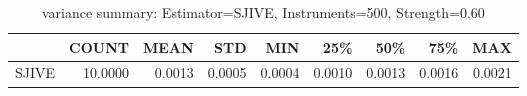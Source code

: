 \begin{table}[ht]
\centering
\caption{variance summary: Estimator=SJIVE, Instruments=500, Strength=0.60}
\begin{tabular}{lrrrrrrrr}
\toprule
 & COUNT & MEAN & STD & MIN & 25\% & 50\% & 75\% & MAX \\
\midrule
SJIVE & 10.0000 & 0.0013 & 0.0005 & 0.0004 & 0.0010 & 0.0013 & 0.0016 & 0.0021 \\
\bottomrule
\end{tabular}
\end{table}
